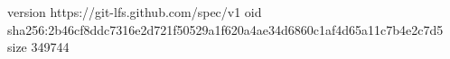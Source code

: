 version https://git-lfs.github.com/spec/v1
oid sha256:2b46cf8ddc7316e2d721f50529a1f620a4ae34d6860c1af4d65a11c7b4e2c7d5
size 349744
